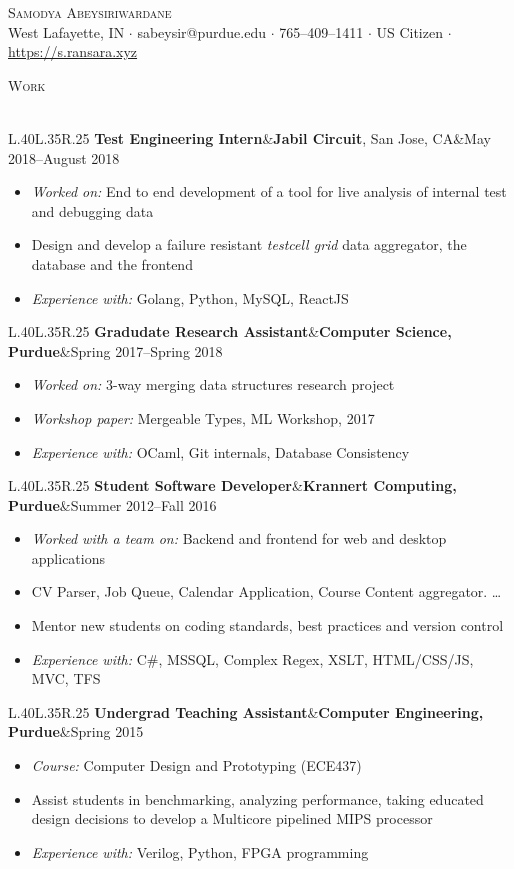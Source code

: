 \documentclass[a4paper]{article}
\newcommand{\header} [1] {
    {\hspace*{-18pt}\vspace*{6pt} \textsc{#1}
    \vspace*{-14pt} \\ \hspace*{-18pt} \hrulefill{} \\
    \vspace{1mm}}
}
\newcommand{\threeparts} [3] {
    {\setlength\tabcolsep{0pt}
    \begin{tabularx}{\linewidth}{L{.40\linewidth}L{.35\linewidth}R{.25\linewidth}} 
    \textbf{#1}&#2&#3
    \end{tabularx}}
}
\begin{document}
\begin{center}
	{\Huge \scshape {Samodya Abeysiriwardane}}\\
	West Lafayette, IN $\cdot$ sabeysir@purdue.edu $\cdot$ 765--409--1411 $\cdot$ US Citizen $\cdot$ \url{https://s.ransara.xyz}\\
\end{center}

\header{Work}
\threeparts{Test Engineering Intern}{\textbf{Jabil Circuit}, San Jose, CA}{May 2018--August 2018}
\begin{itemize}[label=$\square$]
	\item \textit{Worked on:} End to end development of a tool for live analysis of internal test and debugging data
    \item Design and develop a failure resistant \textit{testcell grid} data aggregator, the database and the frontend
    \item \textit{Experience with:} Golang, Python, MySQL, ReactJS
\end{itemize}
\threeparts{Gradudate Research Assistant}{\textbf{Computer Science, Purdue}}{Spring 2017--Spring 2018}
\begin{itemize}[label=$\square$]
    \item \textit{Worked on:} 3-way merging data structures research project
    \item \textit{Workshop paper:} Mergeable Types, ML Workshop, 2017
	\item \textit{Experience with:} OCaml, Git internals, Database Consistency
\end{itemize}
\threeparts{Student Software Developer}{\textbf{Krannert Computing, Purdue}}{Summer 2012--Fall 2016}
\begin{itemize}[label=$\square$]
    \item \textit{Worked with a team on:} Backend and frontend for web and desktop applications
    \item CV Parser, Job Queue, Calendar Application, Course Content aggregator. \dots
    \item Mentor new students on coding standards, best practices and version control
    \item \textit{Experience with:} C\#, MSSQL, Complex Regex, XSLT, HTML/CSS/JS, MVC, TFS
\end{itemize}
\threeparts{Undergrad Teaching Assistant}{\textbf{Computer Engineering, Purdue}}{Spring 2015}
\begin{itemize}[label=$\square$]
	\item \textit{Course:} Computer Design and Prototyping (ECE437)
    \item Assist students in benchmarking, analyzing performance, taking educated design decisions to develop a Multicore pipelined MIPS processor
    \item \textit{Experience with:} Verilog, Python, FPGA programming
\end{itemize}
\end{document}
